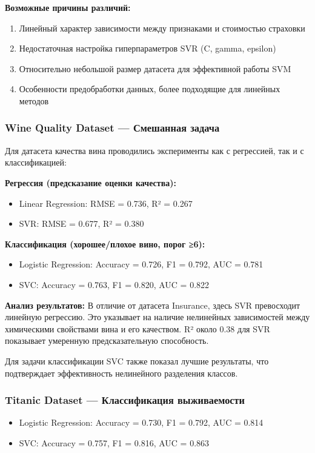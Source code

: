 \documentclass[a4paper]{article}
\begin{document}
\textbf{Возможные причины различий:}
\begin{enumerate}
    \item Линейный характер зависимости между признаками и стоимостью страховки
    \item Недостаточная настройка гиперпараметров SVR (C, gamma, epsilon)
    \item Относительно небольшой размер датасета для эффективной работы SVM
    \item Особенности предобработки данных, более подходящие для линейных методов
\end{enumerate}

\subsubsection{Wine Quality Dataset — Смешанная задача}

Для датасета качества вина проводились эксперименты как с регрессией, так и с классификацией:

\textbf{Регрессия (предсказание оценки качества):}
\begin{itemize}
    \item Linear Regression: RMSE = 0.736, R² = 0.267
    \item SVR: RMSE = 0.677, R² = 0.380
\end{itemize}

\textbf{Классификация (хорошее/плохое вино, порог ≥6):}
\begin{itemize}
    \item Logistic Regression: Accuracy = 0.726, F1 = 0.792, AUC = 0.781
    \item SVC: Accuracy = 0.763, F1 = 0.820, AUC = 0.822
\end{itemize}

\textbf{Анализ результатов:}
В отличие от датасета Insurance, здесь SVR превосходит линейную регрессию. Это указывает на наличие нелинейных зависимостей между химическими свойствами вина и его качеством. R² около 0.38 для SVR показывает умеренную предсказательную способность.

Для задачи классификации SVC также показал лучшие результаты, что подтверждает эффективность нелинейного разделения классов.

\subsubsection{Titanic Dataset — Классификация выживаемости}

\begin{itemize}
    \item Logistic Regression: Accuracy = 0.730, F1 = 0.792, AUC = 0.814
    \item SVC: Accuracy = 0.757, F1 = 0.816, AUC = 0.863
\end{itemize}
\end{document}
